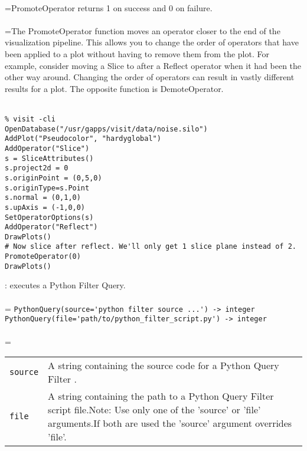 \documentclass[10pt,a4paper]{report}
\begin{document}
 \\ 
\hangindent=\parindent PromoteOperator returns 1 on success and 0 on failure. \\[-3mm] 

 \\ 
\hangindent=\parindent The PromoteOperator function moves an operator closer to the end of the visualization pipeline. This allows you to change the order of operators that have been applied to a plot without having to remove them from the plot. For example, consider moving a Slice to after a Reflect operator when it had been the other way around. Changing the order of operators can result in vastly different results for a plot. The opposite function is DemoteOperator. \\[-3mm] 

\\[-6mm]
\begin{verbatim}% visit -cli
OpenDatabase("/usr/gapps/visit/data/noise.silo")
AddPlot("Pseudocolor", "hardyglobal")
AddOperator("Slice")
s = SliceAttributes()
s.project2d = 0
s.originPoint = (0,5,0)
s.originType=s.Point
s.normal = (0,1,0)
s.upAxis = (-1,0,0)
SetOperatorOptions(s)
AddOperator("Reflect")
DrawPlots()
# Now slice after reflect. We'll only get 1 slice plane instead of 2.
PromoteOperator(0)
DrawPlots()
\end{verbatim}
\newpage


{}
: executes a Python Filter Query.\\[-3mm]

 \\ 
\hangindent=\parindent 
\verb!PythonQuery(source='python filter source ...') -> integer!\\ 
\verb!PythonQuery(file='path/to/python_filter_script.py') -> integer!\\ [-3mm]

 \\ 
\hangindent=\parindent 
\begin{tabular}{lp{9cm}}
\verb!source! & A string containing the source code for a Python Query Filter . \\
\verb!file! & A string containing the path to a Python Query Filter script file.Note: Use only one of the 'source' or 'file' arguments.If both are used the 'source' argument overrides 'file'. \\
\end{tabular} \\[-2mm]
\end{document}
